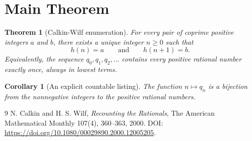 \documentclass{article}
\newtheorem{theorem}{Theorem}
\newtheorem{corollary}{Corollary}
\begin{document}
\section{Main Theorem}

\begin{theorem}[Calkin-Wilf enumeration]\label{thm:calkin_wilf_enumeration}
For every pair of coprime positive integers $a$ and $b$, there exists a unique
integer $n\ge 0$ such that
\[
  h(n)=a
  \qquad\text{and}\qquad
  h(n+1)=b.
\]
Equivalently, the sequence $q_0,q_1,q_2,\ldots$ contains every positive
rational number exactly once, always in lowest terms.
\end{theorem}

\begin{corollary}[An explicit countable listing]\label{cor:explicit_positive_rational_listing}
The function $n\mapsto q_n$ is a bijection from the nonnegative integers to
the positive rational numbers.
\end{corollary}

\begin{thebibliography}{9}
N. Calkin and H. S. Wilf,
\emph{Recounting the Rationals},
The American Mathematical Monthly 107(4), 360--363, 2000.
DOI: \url{https://doi.org/10.1080/00029890.2000.12005205}.
\end{thebibliography}
\end{document}
